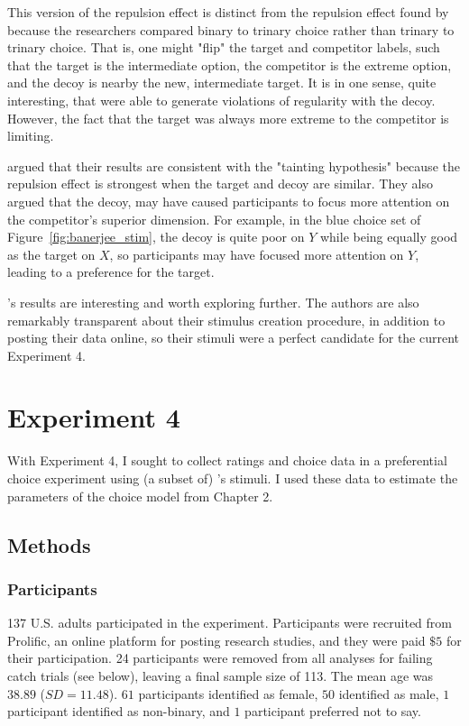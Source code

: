 This version of the repulsion effect is distinct from the repulsion effect found by \textcite{spektorWhenGoodLooks2018b} because the researchers compared binary to trinary choice rather than trinary to trinary choice. That is, one might "flip" the target and competitor labels, such that the target is the intermediate option, the competitor is the extreme option, and the decoy is nearby the new, intermediate target. It is in one sense, quite interesting, that \textcite{banerjeeFactorsThatPromote2024} were able to generate violations of regularity with the decoy. However, the fact that the target was always more extreme to the competitor is limiting. 

\textcite{banerjeeFactorsThatPromote2024} argued that their results are consistent with the "tainting hypothesis" \parencite{simonson2014vices} because the repulsion effect is strongest when the target and decoy are similar. They also argued that the decoy, may have caused participants to focus more attention on the competitor's superior dimension. For example, in the blue choice set of Figure~\ref{fig:banerjee_stim}, the decoy is quite poor on $Y$ while being equally good as the target on $X$, so participants may have focused more attention on $Y$, leading to a preference for the target. 

\textcite{banerjeeFactorsThatPromote2024}'s results are interesting and worth exploring further. The authors are also remarkably transparent about their stimulus creation procedure, in addition to posting their data online, so their stimuli were a perfect candidate for the current Experiment 4.

\section{Experiment 4}

With Experiment 4, I sought to collect ratings and choice data in a preferential choice experiment using (a subset of) \textcite{banerjeeFactorsThatPromote2024}'s stimuli. I used these data to estimate the parameters of the choice model from Chapter 2.

\subsection{Methods}

\subsubsection{Participants}
137 U.S. adults participated in the experiment. Participants were recruited from Prolific, an online platform for posting research studies, and they were paid $\$5$ for their participation. 24 participants were removed from all analyses for failing catch trials (see below), leaving a final sample size of 113. The mean age was $38.89$ ($SD=11.48$). $61$ participants identified as female, $50$ identified as male, $1$ participant identified as non-binary, and $1$ participant preferred not to say.